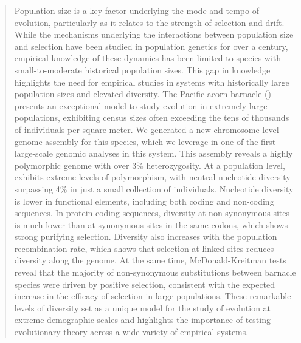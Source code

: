 \begin{abstract}

Population size is a key factor underlying the mode and tempo of evolution,
particularly as it relates to the strength of selection and drift.
While the mechanisms underlying the interactions between population size
and selection have been studied in population genetics for over a century, empirical
knowledge of these dynamics has been limited to species with small-to-moderate
historical population sizes. This gap in knowledge highlights the need for empirical
studies in systems with historically large population sizes and elevated diversity.
The Pacific acorn barnacle (\balgla) presents an exceptional model to study evolution
in extremely large populations, exhibiting census sizes often exceeding the tens of
thousands of individuals per square meter.
We generated a new chromosome-level genome assembly for this species, which we leverage
in one of the first large-scale genomic analyses in this system.
This assembly reveals a highly polymorphic genome with over 3\% heterozygosity.
At a population level, \bgla{} exhibits extreme levels of polymorphism,
with neutral nucleotide diversity surpassing 4\% in just a small collection of
individuals.
Nucleotide diversity is lower in functional elements, including both coding and
non-coding sequences.
In protein-coding sequences, diversity at non-synonymous sites is much lower than at
synonymous sites in the same codons, which shows strong purifying selection.
Diversity also increases with the population recombination rate, which shows that
selection at linked sites reduces diversity along the genome.
At the same time, McDonald-Kreitman tests reveal that the majority of non-synonymous
substitutions between barnacle species were driven by positive selection, consistent
with the expected increase in the efficacy of selection in large populations.
These remarkable levels of diversity set \bgla{} as a unique model for the study of
evolution at extreme demographic scales and highlights the importance of testing
evolutionary theory across a wide variety of empirical systems.

\end{abstract}
